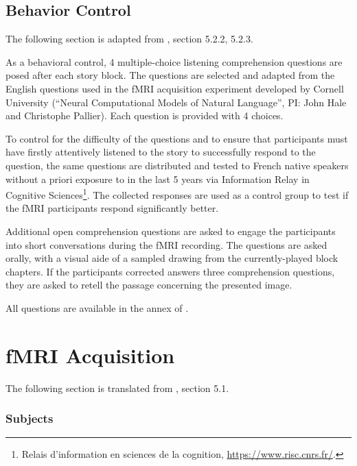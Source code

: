 \subsection{Behavior Control}
The following section is adapted from \textcite{todorovicAnalysesIRMfLors2018}, section 5.2.2, 5.2.3.

As a behavioral control, 4 multiple-choice listening comprehension questions are posed after each story block. The questions are selected and adapted from the English questions used in the fMRI acquisition experiment developed by Cornell University (``Neural Computational Models of Natural Language'', PI: John Hale and Christophe Pallier). Each question is provided with 4 choices. 

To control for the difficulty of the questions and to ensure that participants must have firstly attentively listened to the story to successfully respond to the question, the same questions are distributed and tested to French native speakers without a priori exposure to  in the last 5 years via Information Relay in Cognitive Sciences\footnote{Relais d'information en sciences de la cognition, \url{https://www.risc.cnrs.fr/}.}. The collected responses are used as a control group to test if the fMRI participants respond significantly better.

Additional open comprehension questions are asked to engage the participants into short conversations during the fMRI recording. The questions are asked orally, with a visual aide of a sampled drawing from the currently-played block chapters. If the participants corrected answers three comprehension questions, they are asked to retell the passage concerning the presented image. 

All questions are available in the annex of \textcite{todorovicAnalysesIRMfLors2018}.

\section{fMRI Acquisition}
\label{appsec:fmriacquisition} %
\label{appsubsec:fmridata}

The following section is translated from \textcite{todorovicAnalysesIRMfLors2018}, section 5.1.
\subsubsection{Subjects}

